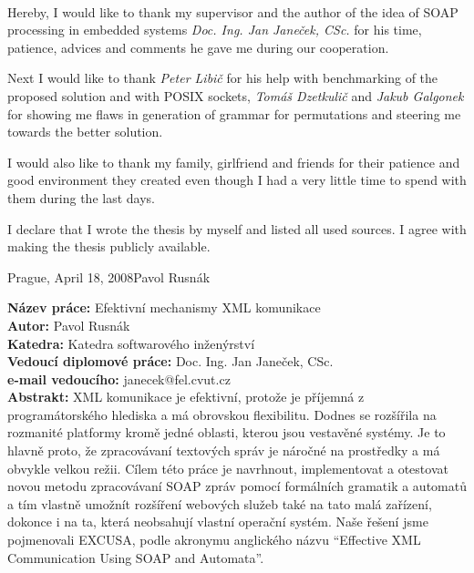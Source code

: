 \documentclass[12pt,notitlepage]{report}
\begin{document}
\normalsize
\setcounter{page}{2}
\ \vspace{10mm}

\noindent Hereby, I would like to thank my supervisor and the author of the idea of SOAP processing in embedded systems \textit{Doc. Ing. Jan Janeček, CSc.} for his time, patience, advices and comments he gave me during our cooperation.

Next I would like to thank \textit{Peter Libič} for his help with benchmarking of the proposed solution and with POSIX sockets, \textit{Tomáš Dzetkulič} and \textit{Jakub Galgonek} for showing me flaws in generation of grammar for permutations and steering me towards the better solution.

I would also like to thank my family, girlfriend and friends for their patience and good environment they created even though I had a very little time to spend with them during the last days.

\vspace{\fill}
\noindent I declare that I wrote the thesis by myself and listed all used sources.
I agree with making the thesis publicly available.

\bigskip
\noindent Prague, April 18, 2008\hspace{\fill}Pavol Rusnák\\

\tableofcontents

\listoffigures

\listoftables

\newpage

\noindent
\textbf{Název práce:} Efektivní mechanismy XML komunikace\\
\textbf{Autor:} Pavol Rusnák\\
\textbf{Katedra:} Katedra softwarového inženýrství\\
\textbf{Vedoucí diplomové práce:} Doc. Ing. Jan Janeček, CSc.\\
\textbf{e-mail vedoucího:} janecek@fel.cvut.cz\\

\noindent \textbf{Abstrakt:}
XML komunikace je efektivní, protože je příjemná z programá\-torského hlediska a má obrovskou flexibilitu. Dodnes se rozšířila na rozmanité platformy kromě jedné oblasti, kterou jsou vestavěné systémy. Je to hlavně proto, že zpracovávaní textových správ je náročné na prostředky a má obvykle velkou režii. Cílem této práce je navrhnout, implementovat a otestovat novou metodu zpracovávaní SOAP zpráv pomocí formálních gramatik a automatů a tím vlastně umožnít rozšíření webových služeb také na tato malá zařízení, dokonce i na ta, která neobsahují vlastní operační systém. Naše řešení jsme pojmenovali EXCUSA, podle akronymu anglického názvu ``Effective XML Communication Using SOAP and Automata''.\\
\end{document}
